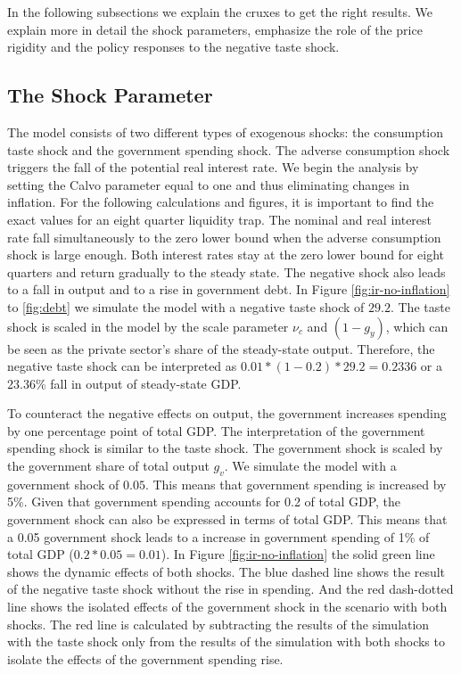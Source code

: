 In the following subsections we explain the cruxes to get the right results. We explain more in detail the shock parameters, emphasize the role of the price rigidity and the policy responses to the negative taste shock.


\subsection*{The Shock Parameter}
The model consists of two different types of exogenous shocks: the consumption taste shock and the government spending shock. The adverse consumption shock triggers the fall of the potential real interest rate. We begin the analysis by setting the Calvo parameter equal to one and thus eliminating changes in inflation. For the following calculations and figures, it is important to find the exact values for an eight quarter liquidity trap. The nominal and real interest rate fall simultaneously to the zero lower bound when the adverse consumption shock is large enough. Both interest rates stay at the zero lower bound for eight quarters and return  gradually to the steady state. The negative shock also leads to a fall in output and to a rise in government debt. In Figure \ref{fig:ir-no-inflation} to \ref{fig:debt} we simulate the model with a negative taste shock of $29.2$. The taste shock is scaled in the model by the scale parameter $\nu_c$ and $\left(1- g_y\right)$, which can be seen as the private sector’s share of the steady-state output. Therefore, the negative taste shock can be interpreted as $0.01 * \left(1-0.2\right) * 29.2 = 0.2336$ or a $23.36\%$ fall in output of steady-state GDP.
\par
\bigskip
To counteract the negative effects on output, the government increases spending by one percentage point of total GDP. The interpretation of the government spending shock is similar to the taste shock.  The government shock is scaled by the government share of total output $g_v$. We simulate the model with a government shock of $0.05$. This means that government spending is increased by 5\%. Given that government spending accounts for 0.2 of total GDP, the government shock can also be expressed in terms of total GDP. This means that a 0.05 government shock leads to a increase in government spending of 1\% of total GDP ($0.2 * 0.05 = 0.01$).
In Figure \ref{fig:ir-no-inflation} the solid green line shows the dynamic effects of both shocks. The blue dashed line shows the result of the negative taste shock without the rise in spending. And the red dash-dotted line shows the isolated effects of the government shock in the scenario with both shocks. The red line is calculated by subtracting the results of the simulation with the taste shock only from the results of the simulation with both shocks to isolate the effects of the government spending rise.
